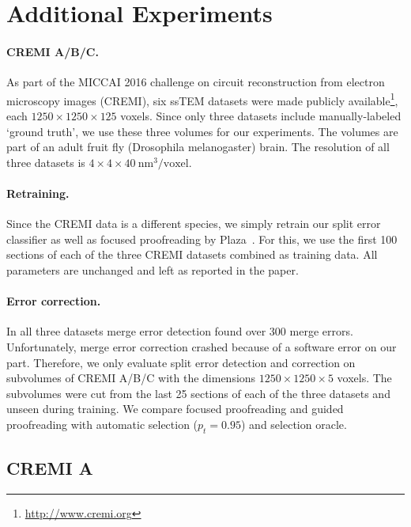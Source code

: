 \section{Additional Experiments}
\label{sec:addexp}

\paragraph{CREMI A/B/C.} As part of the MICCAI 2016 challenge on circuit reconstruction from electron microscopy images (CREMI), six ssTEM datasets were made publicly available\footnote{\scriptsize{\url{http://www.cremi.org}}},  each $1250\times1250\times125$ voxels. Since only three datasets include manually-labeled `ground truth', we use these three volumes for our experiments. The volumes are part of an adult fruit fly (Drosophila melanogaster) brain. The resolution of all three datasets is $4\times4\times40~\text{nm}^3\text{/voxel}$.

\paragraph{Retraining.} Since the CREMI data is a different species, we simply retrain our split error classifier as well as focused proofreading by Plaza~\cite{focused_proofreading}. For this, we use the first 100 sections of each of the three CREMI datasets combined as training data. All parameters are unchanged and left as reported in the paper. 

\paragraph{Error correction.} In all three datasets merge error detection found over 300 merge errors. Unfortunately, merge error correction crashed because of a software error on our part. Therefore, we only evaluate split error detection and correction on subvolumes of CREMI A/B/C with the dimensions $1250\times1250\times5$ voxels. The subvolumes were cut from the last 25 sections of each of the three datasets and unseen during training. We compare focused proofreading and guided proofreading with automatic selection ($p_t=0.95$) and selection oracle.

\subsection{CREMI A}

